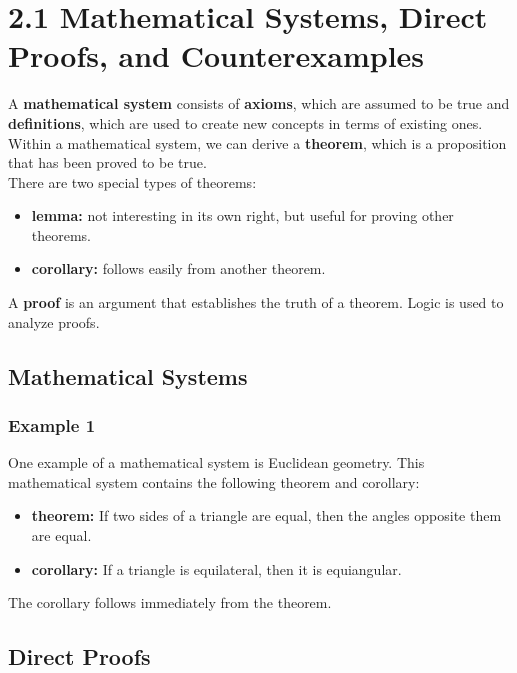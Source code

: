 \section*{2.1 Mathematical Systems, Direct Proofs, and Counterexamples}

A \textbf{mathematical system} consists of \textbf{axioms}, which are assumed to be true and \textbf{definitions}, which are used to create new concepts in terms of existing ones.  Within a mathematical system, we can derive a \textbf{theorem}, which is a proposition that has been proved to be true.\\

There are two special types of theorems:

\begin{itemize}
    \item \textbf{lemma:} not interesting in its own right, but useful for proving other theorems.
    \item \textbf{corollary:} follows easily from another theorem.
\end{itemize}

A \textbf{proof} is an argument that establishes the truth of a theorem.  Logic is used to analyze proofs.

\subsection*{Mathematical Systems}

\subsubsection*{Example 1}

One example of a mathematical system is Euclidean geometry.  This mathematical system contains the following theorem and corollary:

\begin{itemize}
    \item \textbf{theorem:} If two sides of a triangle are equal, then the angles opposite them are equal.
    \item \textbf{corollary:} If a triangle is equilateral, then it is equiangular.
\end{itemize}

The corollary follows immediately from the theorem.

\subsection*{Direct Proofs}

